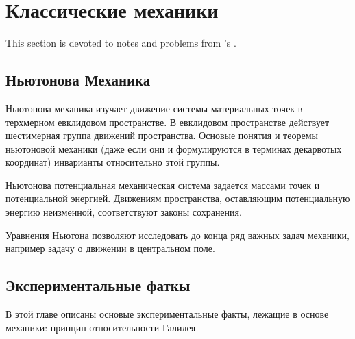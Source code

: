 \chapter{Классические механики}
This section is devoted to notes and problems from 's \emph{}
\cite{arnold}.

\section{Ньютонова Механика}
Ньютонова механика изучает движение системы материальных точек в терхмерном
евклидовом пространстве. В евклидовом пространстве действует шестимерная
группа движений пространства. Основые понятия и теоремы ньютоновой механики
(даже если они и формулируются в терминах декарвотых координат) инварианты
относительно этой группы.

Ньютонова потенциальная механическая система задается массами точек и
потенциальной энергией. Движениям пространства, оставляющим потенциальную
энергию неизменной, соответствуют законы сохранения.

Уравнения Ньютона позволяют исследовать до конца ряд важных задач механики,
например задачу о движении в центральном поле.

\section{Экспериментальные фаткы}
В этой главе  описаны основые экспериментальные факты, лежащие в основе
механики: принцип относительности Галилея

